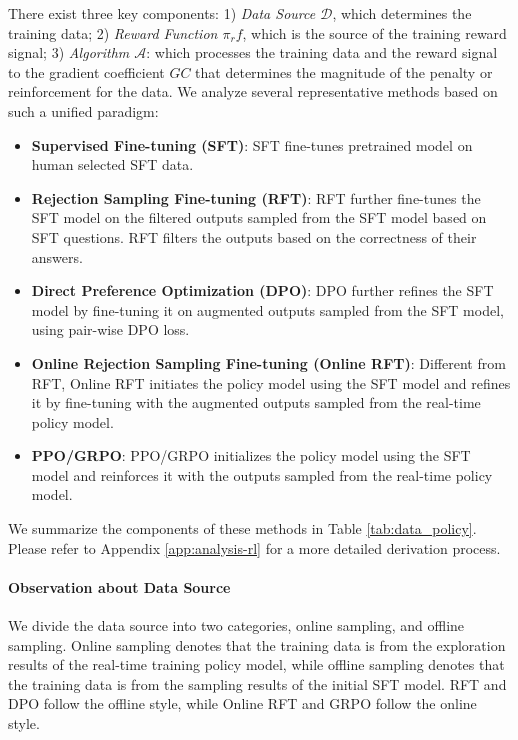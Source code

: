 There exist three key components: 1) \textit{Data Source $\mathcal{D}$}, which determines the training data; 2) \textit{Reward Function $\pi_rf$}, which is the source of the training reward signal; 3) \textit{Algorithm $\mathcal{A}$}: which processes the training data and the reward signal to the gradient coefficient $GC$ that determines the magnitude of the penalty or reinforcement for the data. We analyze several representative methods based on such a unified paradigm:

\begin{itemize}
    \item  \textbf{Supervised Fine-tuning (SFT)}: SFT fine-tunes pretrained model on human selected SFT data.
    \item \textbf{Rejection Sampling Fine-tuning (RFT)}: RFT further fine-tunes the SFT model on the filtered outputs sampled from the SFT model based on SFT questions. RFT filters the outputs based on the correctness of their answers.
    \item \textbf{Direct Preference Optimization (DPO)}: DPO further refines the SFT model by fine-tuning it on augmented outputs sampled from the SFT model, using pair-wise DPO loss.
    \item \textbf{Online Rejection Sampling Fine-tuning (Online RFT)}: Different from RFT, Online RFT initiates the policy model using the SFT model and refines it by fine-tuning with the augmented outputs sampled from the real-time policy model.
    \item \textbf{PPO/GRPO}: PPO/GRPO initializes the policy model using the SFT model and reinforces it with the outputs sampled from the real-time policy model.
\end{itemize}

We summarize the components of these methods in Table \ref{tab:data_policy}.
Please refer to Appendix \ref{app:analysis-rl} for a more detailed derivation process.

\paragraph{Observation about Data Source} We divide the data source into two categories, online sampling, and offline sampling. Online sampling denotes that the training data is from the exploration results of the real-time training policy model, while offline sampling denotes that the training data is from the sampling results of the initial SFT model. RFT and DPO follow the offline style, while Online RFT and GRPO follow the online style. 

